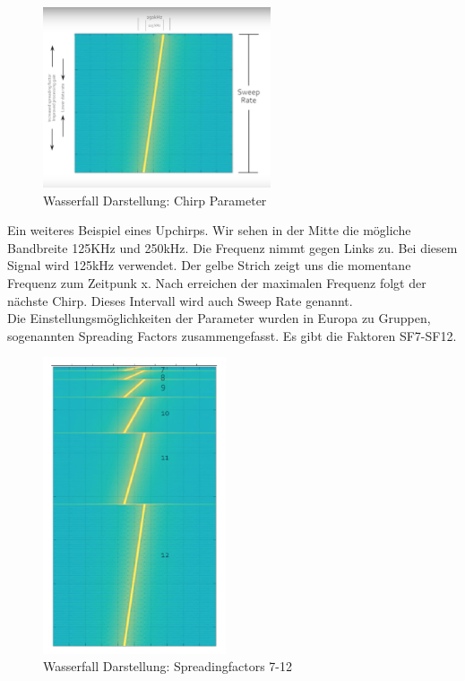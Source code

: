 \documentclass[11pt,english,german]{report}
\theoremstyle{definition}
\begin{document}
\begin{figure}[H]
	\centering
	\includegraphics[width=0.6\textwidth]{img/chirp.png}
	\caption[Wasserfall Darstellung: Chirp Parameter]
	{Wasserfall Darstellung: Chirp Parameter}
\end{figure}

\noindent
Ein weiteres Beispiel eines Upchirps. Wir sehen in der Mitte die mögliche Bandbreite 125KHz und 250kHz. Die Frequenz nimmt gegen Links zu. Bei diesem Signal wird 125kHz verwendet. Der gelbe Strich zeigt uns die momentane Frequenz zum Zeitpunk x. Nach erreichen der maximalen Frequenz folgt der nächste Chirp. Dieses Intervall wird auch Sweep Rate genannt.\\[0.3cm]
Die Einstellungsmöglichkeiten der Parameter wurden in Europa zu Gruppen, sogenannten Spreading Factors zusammengefasst. Es gibt die Faktoren SF7-SF12.

\begin{figure}[H]
	\centering
	\includegraphics[width=0.48\textwidth]{img/spreadingfactors.png}
	\caption[Wasserfall Darstellung: Spreadingfactors 7-12]
	{Wasserfall Darstellung: Spreadingfactors 7-12}
\end{figure}
\end{document}
